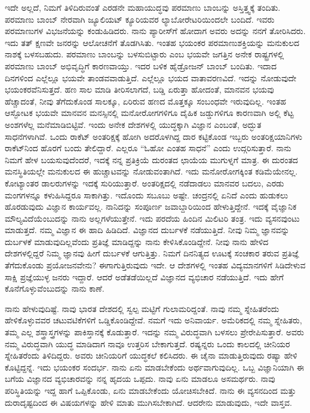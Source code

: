 ಇದೇ ಅಲ್ಲದೆ, ನಿಮಗೆ ತಿಳಿದಿರುವಂತೆ ಎರಡನೇ ಮಹಾಯುದ್ಧವು ಪರಮಾಣು ಬಾಂಬನ್ನು ಅಸ್ತಿತ್ತ್ವಕ್ಕೆ ತಂದಿತು. ಪರಮಾಣು ಬಾಂಬ್ ನೇರವಾಗಿ ಜ್ಯೂಲಿಯಟ್ ಕ್ಯೂರಿಯವರ ಲ್ಯಾಬೋರೇಟರಿಯಿಂದಲೇ ಬಂದಿದೆ. ಇವರು ಪರಮಾಣುಗಳ ವಿಭಜನೆಯನ್ನು ಕಂಡುಹಿಡಿದರು. ನಾನು ಪ್ಯಾರೀಸ್‍ಗೆ ಹೋದಾಗ ಅವರು ಅದನ್ನು ನನಗೆ ತೋರಿಸಿದರು. ಇದು ತತ್ ಕ್ಷಣವೇ ಜನರನ್ನು ಆಲೋಚನೆಗೆ ತೊಡಗಿಸಿತು. ಇಂತಹ ಭಯಂಕರ ಪರಮಾಣುಶಕ್ತಿಯನ್ನು ಮನುಕುಲದ ನಾಶಕ್ಕೆ ಬಳಸಬಹುದು. ಪರಮಾಣು ಬಾಂಬನ್ನು ಬಳಸುಬಿಟ್ಟಾರು ಎಂಬ ಭಯವೇ ಜಗತ್ತಿನ ಅನೇಕ ರಾಷ್ಟ್ರಗಳಲ್ಲಿ ಪರಮಾಣು ಬಾಂಬ್ ಅಭಿವೃದ್ಧಿಗೆ ಕಾರಣವಾಯ್ತು. ಇದರ ಬಳಿಕ ಹೈಡ್ರೋಜನ್ ಬಾಂಬ್ ಬಂದಿತು. ಇದಾದ ದಿನಗಳಿಂದ ಎಲ್ಲೆಲ್ಲೂ ಭಯವೇ ತಾಂಡವವಾಡುತ್ತಿದೆ. ಎಲ್ಲೆಲ್ಲೂ ಭಯದ ವಾತಾವರಣವಿದೆ. ಇದನ್ನು ನೋಡುವುದೇ ಭಯಂಕರವೆನಿಸುತ್ತದೆ. ಹಣ ಸಾಲ ಮಾಡಿ ತೀರಿಸಲಾಗದೆ, ಬಡ್ಡಿ ಏರುತ್ತಾ ಹೋದಂತೆ, ಮಾನವನ ಭಯವು ಹೆಚ್ಚಾದಂತೆ, ನೀವು ತೆಗೆದುಕೊಂಡ ಸಾಲಕ್ಕೂ, ಏರಿರುವ ಹಣದ ಮೊತ್ತಕ್ಕೂ ಸಂಬಂಧವೇ ಇರುವುದಿಲ್ಲ. ಇಂತಹ ಆಸ್ಫೋಟಕ ಭಯವೇ ಮಾನವನ ಮನಸ್ಸಿನಲ್ಲಿ ಮನೋರೋಗಗಳಿಗೂ ದೈಹಿಕ ಜಡ್ಡುಗಳಿಗೂ ಕಾರಣವಾಗಿ ಅಲ್ಲಿ ಕೆಟ್ಟ ಅಂಶಗಳೆಲ್ಲ ಮನೆಮಾಡಿಬಿಟ್ಟಿವೆ. ಇಂದು ಅನೇಕ ದೇಶಗಳಲ್ಲಿ ಯುದ್ಧಕ್ಕಾಗಿ ವಿಜ್ಞಾನ ಎಂಬಂತೆ, ಅದ್ಭುತ ಸಾಧನೆಗಳಾಗಿವೆ. ಒಂದು ರಾಕೆಟ್ ಅಂತರಿಕ್ಷಕ್ಕೆ ಹೋಗಿ ಅದರೊಳಗಿದ್ದ ದಾರ ಕಟ್ಟಿಕೊಂಡ ಇಬ್ಬರು ಅಂತರಿಕ್ಷಯಾನಿಗಳು ರಾಕೆಟ್‍ನಿಂದ ಹೊರಗೆ ಬಂದು ತೇಲಿದ್ದಾರೆ. ಎಲ್ಲರೂ “ಓಹೋ ಎಂತಹ ಸಾಧನೆ” ಎಂದು ಉದ್ಗರಿಸುತ್ತಾರೆ. ನಾನು ನಿಮಗೆ ಹೇಳ ಬಯಸುವುದೆಂದರೆ, ಇದಕ್ಕೆ ನನ್ನ ಪ್ರತಿಕ್ರಿಯೆ ದುರಂತದ ಛಾಯೆಯ ಮುಗುಳ್ನಗೆ ಮಾತ್ರ. ಈ ದುರಂತದ ಮನಸ್ಥಿತಿಯಲ್ಲೇ ಮನುಕುಲದ ಈ ಹುಚ್ಚಾಟವನ್ನು ನೋಡುವಂತಾಗಿದೆ. ಇದು ಮನೋರೋಗಕ್ಕಿಂತ ಕಡಿಮೆಯೇನಲ್ಲ. ಕೋಟ್ಯಾಂತರ ಡಾಲರುಗಳನ್ನು ಇದಕ್ಕೆ ಸುರಿಯುತ್ತಾರೆ. ಅಂತರಿಕ್ಷದಲ್ಲಿ ನಡೆದಾಡಲು ಮಾನವರ ಬದಲು, ಎರಡು ಮಂಗಗಳನ್ನೂ ಕಳುಹಿಸಿದ್ದರೂ ಸಾಕಾಗಿತ್ತು. ಇದೊಂದು ಸಬೂಬು ಅಷ್ಟೇ. ಚಂದ್ರನಲ್ಲಿ ಏನಿದೆ ಎಂದು ಹುಡುಕಲು ಹೊರಡುವುದು ವಿಜ್ಞಾನ ಕಾರ್ಯವಲ್ಲ. ನಾನಿದನ್ನು ಸಂಪೂರ್ಣ ಜವಾಬ್ದಾರಿಯಿಂದ ಹೇಳುತ್ತಿದ್ದೇನೆ. ಇದಕ್ಕೆ ವೈಜ್ಞಾನಿಕ ಮೌಲ್ಯವಿದೆಯೆಂಬುದನ್ನು ನಾನು ಅಲ್ಲಗಳೆಯುತ್ತೇನೆ. ಇದು ಪರದೆಯ ಹಿಂದಿನ ಮಿಲಿಟರಿ ತಂತ್ರ. ಇದು ವ್ಯಸನವುಂಟು ಮಾಡುತ್ತದೆ. ನಮ್ಮ ವಿಜ್ಞಾನ ಈ ಹಾದಿ ಹಿಡಿದಿದೆ. ವಿಜ್ಞಾನದ ದುರ್ಬಳಕೆ ನಡೆಯುತ್ತಿದೆ. ನೀವು ನಿಮ್ಮ ಜ್ಞಾನವನ್ನು ದುರ್ಬಳಕೆ ಮಾಡುವುದಿಲ್ಲವೆಂದು ಪ್ರತಿಜ್ಞೆ ಮಾಡಿದ್ದನ್ನು ನಾನು ಕೇಳಿಸಿಕೊಂಡಿದ್ದೇನೆ. ನೀವು ನಾನು ಹೇಳಿದ ದೇಶಗಳಲ್ಲಿದ್ದರೆ ನಿಮ್ಮ ಜ್ಞಾನವು ಹೀಗೆ ದುರ್ಬಳಕೆ ಆಗುತ್ತಿತ್ತು. ನಿಮಗೆ ದಿನನಿತ್ಯದ ಊಟಕ್ಕೆ ಸಂಚಕಾರ ತರುವ ಪ್ರತಿಜ್ಞೆ ತೆಗೆದುಕೊಂಡು ಪ್ರಯೋಜನವೇನು? ಈಗಾಗುತ್ತಿರುವುದು ಇದೇ. ಆ ದೇಶಗಳಲ್ಲಿ ಇಂತಹ ವಿದ್ಯಮಾನಗಳಿಗೆ ಸಿಡಿದೇಳುವ ಸಾಕ್ಷಿ ಪ್ರಜ್ಞೆಯುಳ್ಳ ಜನರು ಇದ್ದಾರೆ. ಆದರೆ ಅಡೆತಡೆಯಿಲ್ಲದೆ ವಿಜ್ಞಾನದ ವ್ಯಭಿಚಾರ ನಡೆಯುತ್ತಿದೆ. ಇದು ಹೇಗೆ ಕೊನೆಗೊಳ್ಳುವೆಂಬುದನ್ನು ನಾನು ಕಾಣೆ.

ನಾನು ಹೇಳುವುದಿಷ್ಟೆ. ನಾವು ಭಾರತ ದೇಶದಲ್ಲಿ ಸ್ವಲ್ಪ ಮಟ್ಟಿಗೆ ಗುಲಾಮರಿದ್ದಂತೆ. ನಾವು ನಮ್ಮ ಸ್ನೇಹಿತರೆಂದು ಹೇಳಿಕೊಳ್ಳುವವರ ಚಟುವಟಿಕೆಗಳಿಗೆ ಒಡ್ಡಿಕೊಂಡಿದ್ದೇವೆ. ನಮಗೆ ಇದು ಅನಿವಾರ್ಯ. ಅಮೆರಿಕದಲ್ಲಿ ನಮ್ಮ ಸ್ನೇಹಿತರು, ತಮ್ಮ ಎಲ್ಲ ಶಸ್ತ್ರಾಸ್ತ್ರಗಳನ್ನು ಪಾಕಿಸ್ತಾನಕ್ಕೆ ಕೊಡುತ್ತಾರೆ. ಇದನ್ನು ನಮ್ಮ ವಿರುದ್ಧವಾಗಿ ಬಳಸಲು ಪ್ರೇರೇಪಿಸುತ್ತಾರೆ. ಅವರು ನಮ್ಮ ವಿರುದ್ಧವಾಗಿ ಯುದ್ಧ ಮಾಡಿದಾಗ ನಾವೂ ಉತ್ತರಿಸ ಬೇಕಾಗುತ್ತದೆ. ರಷ್ಯನ್ನರು ಒಂದು ಕಾಲದಲ್ಲಿ ಚೀನಿಯರ ಸ್ನೇಹಿತರೆಂದು ತಿಳಿದಿದ್ದರು. ಅವರು ಚೀನಿಯರಿಗೆ ಯುದ್ಧಕಲೆ ಕಲಿಸಿದರು. ಈ ಚೈನಾ ಮಾಡುತ್ತಿರುವುದು ರಷ್ಯಾ ಹೇಳಿ ಕೊಟ್ಟಿದ್ದನ್ನೆ. ಇದು ಭಯಂಕರ ಸಂದರ್ಭ. ನಾನು ಏನು ಮಾಡಬೇಕೆಂದು ಅರ್ಥವಾಗುವುದಿಲ್ಲ. ಒಬ್ಬ ವಿಜ್ಞಾನಿಯಾಗಿ ಈ ಬಗೆಯ ವಿಜ್ಞಾನದ ವ್ಯಭಿಚಾರವನ್ನು ನನ್ನ ಹೃದಯ ಒಪ್ಪದು. ನಾವು ಏನು ಮಾಡಲೂ ಅಸಮರ್ಥರು. ನಾವು ಪರಿಸ್ಥಿತಿಯನ್ನು ಇದ್ದ ಹಾಗೆ ಒಪ್ಪಿಕೊಂಡು, ಏನು ಮಾಡಬೇಕೆಂದು ಯೋಚಿಸಬೇಕಿದೆ. ನಾನು ಈ ವ್ಯಸನದಿಂದ ಮತ್ತು ದುರಾದೃಷ್ಟದಿಂದ ಈ ವಿಷಯಗಳನ್ನು ಹೇಳಿ ಮಾತು ಮುಗಿಸಬೇಕಾಗಿದೆ. ಆದರೇನು ಮಾಡುವುದು, ಇದೇ ವಾಸ್ತವ.


